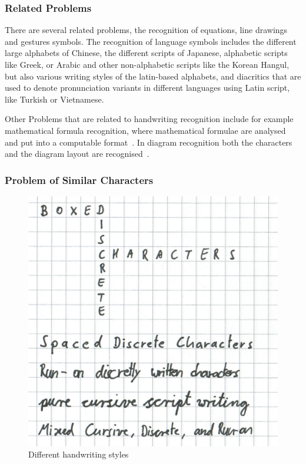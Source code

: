 \subsubsection{Related Problems}
\label{sec:relatedproblems}

There are several related problems, the recognition of equations, line 
drawings and gestures symbols. The recognition of language symbols includes 
the different large alphabets of Chinese, the different scripts of Japanese, 
alphabetic scripts like Greek, or Arabic and other non-alphabetic scripts like
the Korean  Hangul, but also various writing styles of the latin-based 
alphabets, and diacritics that are used to denote pronunciation variants in 
different languages using Latin script, like Turkish or Vietnamese.

Other Problems that are related to handwriting recognition include for example
mathematical formula recognition, where mathematical formulae are analysed and 
put into a computable format~. In diagram recognition 
both the characters and the diagram layout are 
recognised~.

\subsubsection{Problem of Similar Characters}
\label{sec:similarcharacters}

\begin{figure}[htbp]
\begin{center}
\includegraphics[scale=0.3]{images/differentHandwritingStylesSelfmade.png}
\caption{Different handwriting styles}
\label{fig:differenthandwritingstyles}
\end{center}
\end{figure}

